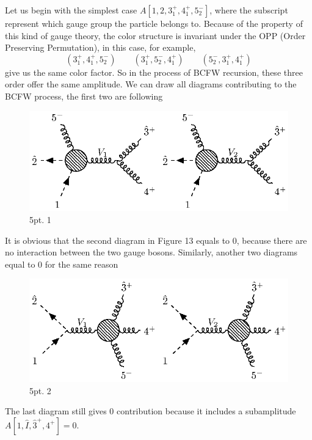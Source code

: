 \documentclass[12pt]{article}
\numberwithin{equation}{section}
\begin{document}
Let us begin with the simplest case $A[1,2,3_1^+,4_1^+,5_2^-]$, where the subscript represent which gauge group the particle belongs to. Because of the property 
of this kind of gauge theory, the color structure is invariant under the OPP (Order Preserving Permutation), in this case, for example,
\begin{equation}
    (3_1^+,4_1^+,5_2^-)\qquad (3_1^+,5_2^-,4_1^+)\qquad(5_2^-,3_1^+,4_1^+)
\end{equation}
give us the same color factor. So in the process of BCFW recursion, these three order offer the same amplitude. We can draw all diagrams contributing to the BCFW process, the first two are following
\par
\begin{figure}[H]
    \centering
    \includegraphics{5pt1.eps}
    \caption{5pt. 1}
    \label{2}
\end{figure}
It is obvious that the second diagram in Figure 13 equals to 0, because there are no interaction between the two gauge bosons.
Similarly, another two diagrams equal to 0 for the same reason
\begin{figure}[H]
    \centering
    \includegraphics{5pt2.eps}
    \caption{5pt. 2}
    \label{3}
\end{figure}
\par
The last diagram still gives 0 contribution because it includes a subamplitude $A[1,\hat{I},\hat{3}^+,4^+]=0$.
\par
\end{document}
